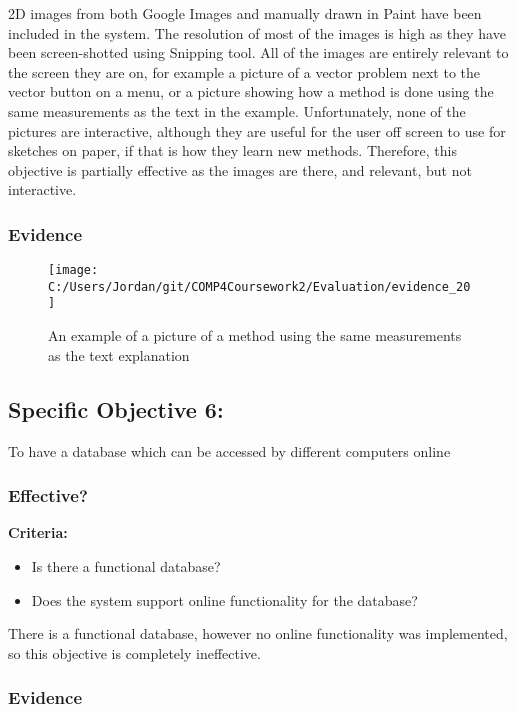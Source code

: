 2D images from both Google Images and manually drawn in Paint have been included in the system. The resolution of most of the images is high as they have been screen-shotted using Snipping tool. All of the images are entirely relevant to the screen they are on, for example a picture of a vector problem next to the vector button on a menu, or a picture showing how a method is done using the same measurements as the text in the example. Unfortunately, none of the pictures are interactive, although they are useful for the user off screen to use for sketches on paper, if that is how they learn new methods. Therefore, this objective is partially effective as the images are there, and relevant, but not interactive.

\subsubsection{Evidence}

\begin{figure}[H]
	\texttt{[image: C:/Users/Jordan/git/COMP4Coursework2/Evaluation/evidence\_20]}
	\caption{An example of a picture of a method using the same measurements as the text explanation}
\end{figure}

\subsection{Specific Objective 6: }

To have a database which can be accessed by different computers online

\subsubsection{Effective?}

\textbf{Criteria: }

\begin{itemize}
	\item Is there a functional database?
	\item Does the system support online functionality for the database?
\end{itemize}

There is a functional database, however no online functionality was implemented, so this objective is completely ineffective.

\subsubsection{Evidence}


